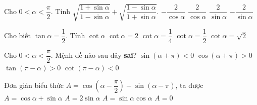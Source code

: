 \begin{ex}%
	Cho $0< \alpha < \dfrac{\pi}{2}$.  Tính $\sqrt{\dfrac{1+\sin \alpha}{1-\sin \alpha}}+\sqrt{\dfrac{1-\sin \alpha}{1+\sin \alpha}}$.
	 \choice
		{$-\dfrac{2}{\cos  \alpha}$}
		{\True $\dfrac{2}{\cos \alpha}$} 
		 {$\dfrac{2}{\sin \alpha}$}
		{$-\dfrac{2}{\sin \alpha}$} 
\end{ex}

\begin{ex}%
	Cho biết  $\tan \alpha =\dfrac{1}{2} $. Tính $\cot \alpha $
	\choice 
		{\True $\cot \alpha  =2$}
		{$\cot \alpha =\dfrac{1}{4} $} 
		{$\cot \alpha =\dfrac{1}{2}  $}
		{$\cot \alpha  =\sqrt{2} $}
\end{ex}

\begin{ex}%
	Cho $0<\alpha <\dfrac{\pi}{2} $. Mệnh đề nào sau đây \textbf{sai}? 
	\choice 
		 {$\sin (\alpha +\pi)<0$}
		 {$\cos (\alpha +\pi)>0$}
		{\True $\tan (\pi -\alpha)>0$} 
		 {$\cot (\pi -\alpha)<0$}
\end{ex}

\begin{ex}%
	Đơn giản biểu  thức $A=\cos \left(\alpha-\dfrac{\pi}{2} \right)+\sin (\alpha-\pi)$, ta được
	\choice 
		{$A=\cos \alpha+\sin  \alpha$}
		 {$A=2\sin \alpha$}
		{$A=\sin \alpha  \cos \alpha$}
		{\True $A=0$} 
\end{ex}

